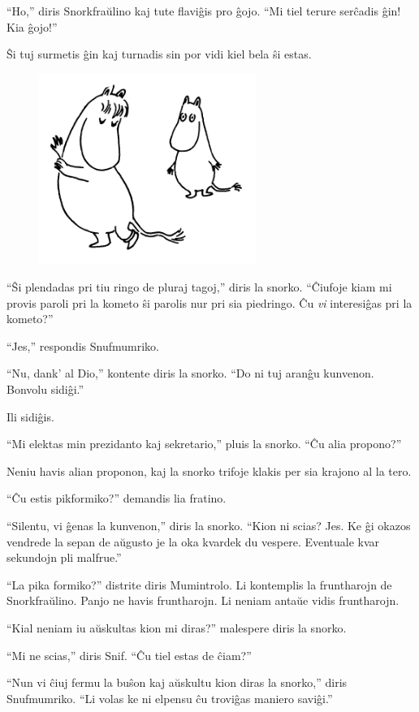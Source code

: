 ``Ho,'' diris Snorkfraŭlino kaj tute flaviĝis pro ĝojo. ``Mi tiel terure serĉadis ĝin! Kia ĝojo!''

Ŝi tuj surmetis ĝin kaj turnadis sin por vidi kiel bela ŝi estas.

\begin{figure}[htbp]
\centering
\includegraphics[width=200pt,height=176pt]{5-5.png}
\caption{}
\label{5-5}
\end{figure}

``Ŝi plendadas pri tiu ringo de pluraj tagoj,'' diris la snorko. ``Ĉiufoje kiam mi provis paroli pri la kometo ŝi parolis nur pri sia piedringo. Ĉu \emph{vi} interesiĝas pri la kometo?''

``Jes,'' respondis Snufmumriko.

``Nu, dank' al Dio,'' kontente diris la snorko. ``Do ni tuj aranĝu kunvenon. Bonvolu sidiĝi.''

Ili sidiĝis.

``Mi elektas min prezidanto kaj sekretario,'' pluis la snorko. ``Ĉu alia propono?''

Neniu havis alian proponon, kaj la snorko trifoje klakis per sia krajono al la tero.

``Ĉu estis pikformiko?'' demandis lia fratino.

``Silentu, vi ĝenas la kunvenon,'' diris la snorko. ``Kion ni scias? Jes. Ke ĝi okazos vendrede la sepan de aŭgusto je la oka kvardek du vespere. Eventuale kvar sekundojn pli malfrue.''

``La pika formiko?'' distrite diris Mumintrolo. Li kontemplis la fruntharojn de Snorkfraŭlino. Panjo ne havis fruntharojn. Li neniam antaŭe vidis fruntharojn.

``Kial neniam iu aŭskultas kion mi diras?'' malespere diris la snorko.

``Mi ne scias,'' diris Snif. ``Ĉu tiel estas de ĉiam?''

``Nun vi ĉiuj fermu la buŝon kaj aŭskultu kion diras la snorko,'' diris Snufmumriko. ``Li volas ke ni elpensu ĉu troviĝas maniero saviĝi.''


